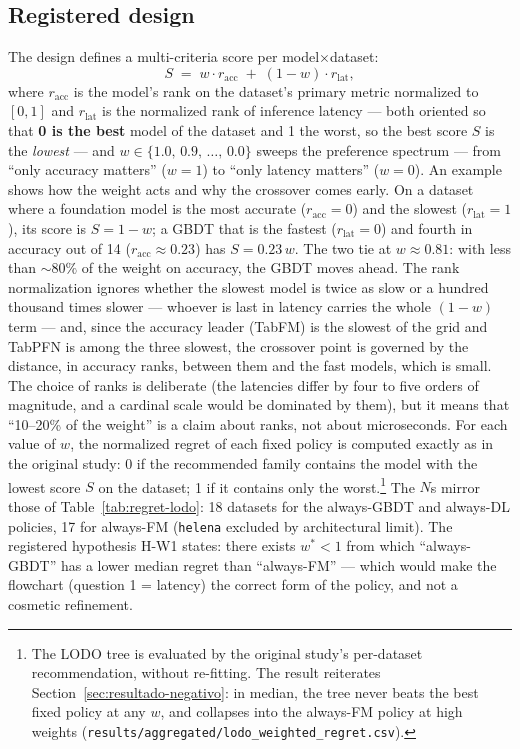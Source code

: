 \subsection{Registered design}
\label{sec:e2-desenho}

The design defines a multi-criteria score per model$\times$dataset:
\begin{equation}
S \;=\; w \cdot r_{\text{acc}} \;+\; (1-w) \cdot r_{\text{lat}},
\label{eq:score-ponderado}
\end{equation}
where $r_{\text{acc}}$ is the model's rank on the dataset's primary
metric normalized to $[0,1]$ and $r_{\text{lat}}$ is the normalized
rank of inference latency --- both oriented so that \textbf{0 is the
best} model of the dataset and 1 the worst, so the best score $S$ is
the \emph{lowest} --- and
$w \in \{1.0,\, 0.9,\, \ldots,\, 0.0\}$ sweeps the preference
spectrum --- from ``only accuracy matters'' ($w{=}1$) to ``only
latency matters'' ($w{=}0$). An example shows how the weight acts
and why the crossover comes early. On a dataset where a foundation
model is the most accurate ($r_{\text{acc}}{=}0$) and the slowest
($r_{\text{lat}}{=}1$), its score is $S = 1-w$; a GBDT that is the
fastest ($r_{\text{lat}}{=}0$) and fourth in accuracy out of 14
($r_{\text{acc}} \approx 0.23$) has $S = 0.23\,w$. The two tie at
$w \approx 0.81$: with less than ${\sim}80\%$ of the weight on
accuracy, the GBDT moves ahead. The rank normalization ignores
whether the slowest model is twice as slow or a hundred thousand
times slower
--- whoever is last in latency carries the whole $(1-w)$ term ---
and, since the accuracy leader (TabFM) is the slowest of the grid
and TabPFN is among the three slowest, the crossover point is
governed by the distance, in accuracy ranks, between them and the
fast models, which is small. The choice of ranks is deliberate (the
latencies differ by four to five orders of magnitude, and a cardinal
scale
would be dominated by them), but it means that ``10--20\% of the
weight'' is a claim about ranks, not about microseconds. For each
value of $w$, the normalized regret of each fixed policy is computed
exactly as in the original study: 0 if the recommended family
contains the model with the lowest score $S$ on the dataset; 1 if it
contains only the worst.\footnote{The LODO tree is evaluated by the
original study's per-dataset recommendation, without re-fitting. The
result reiterates Section~\ref{sec:resultado-negativo}: in median,
the tree never beats the best fixed policy at any $w$, and collapses
into the always-FM policy at high weights
(\texttt{results/\allowbreak aggregated/\allowbreak lodo\_\allowbreak weighted\_\allowbreak regret.\allowbreak csv}).}
The $N$s mirror those of Table~\ref{tab:regret-lodo}: 18 datasets
for the always-GBDT and always-DL policies, 17 for always-FM
(\texttt{helena} excluded by architectural limit). The registered
hypothesis H-W1 states: there exists $w^{*} < 1$ from which
``always-GBDT'' has a lower median regret than ``always-FM'' ---
which would make the flowchart (question 1 = latency) the correct
form of the policy, and not a cosmetic refinement.

